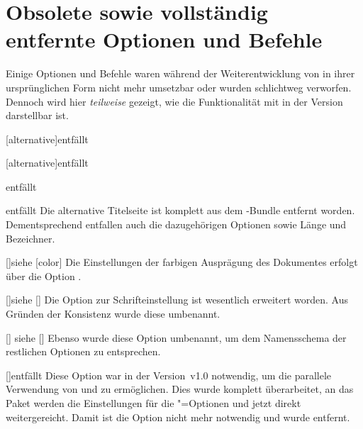 \chapter{Obsolete sowie vollständig entfernte Optionen und Befehle}
Einige Optionen und Befehle waren während der Weiterentwicklung von \TUDScript
in ihrer ursprünglichen Form nicht mehr umsetzbar oder wurden schlichtweg 
verworfen. Dennoch wird hier \emph{teilweise} gezeigt, wie die Funktionalität 
mit \TUDScript in der Version \vTUDScript{} darstellbar ist.

\begin{Declaration}{[alternative]}{entfällt}
\begin{Declaration}{[alternative]}{entfällt}
\begin{Declaration}{}{entfällt}
\begin{Declaration}{}{entfällt}
\printdeclarationlist*%
%
%
Die alternative Titelseite ist komplett aus dem \TUDScript-Bundle entfernt 
worden. Dementsprechend entfallen auch die dazugehörigen Optionen sowie Länge 
und Bezeichner.
\end{Declaration}
\end{Declaration}
\end{Declaration}
\end{Declaration}

\begin{Declaration}{[\PBoolean]}{siehe [color]}
\printdeclarationlist*%
%
Die Einstellungen der farbigen Ausprägung des Dokumentes erfolgt über die 
Option .
\end{Declaration}

\begin{Declaration}{[\PBoolean]}{siehe [\PSet]}
\printdeclarationlist*%
%
Die Option zur Schrifteinstellung ist wesentlich erweitert worden. Aus Gründen 
der Konsistenz wurde diese umbenannt.
\end{Declaration}

\begin{Declaration}{[\PBoolean]}{
  siehe [\PBoolean]%
}
\printdeclarationlist*%
%
Ebenso wurde diese Option umbenannt, um dem Namensschema der restlichen 
Optionen zu entsprechen.
\end{Declaration}

\begin{Declaration}{[\PSet]}{entfällt}
\printdeclarationlist*%
%
Diese Option war in der Version~v1.0 notwendig, um die parallele Verwendung von 
 und  zu ermöglichen. Dies wurde komplett 
überarbeitet, an das Paket  werden die Einstellungen für die 
\KOMAScript"=Optionen  und  jetzt 
direkt weitergereicht. Damit ist die Option  nicht mehr 
notwendig und wurde entfernt.
\end{Declaration}

